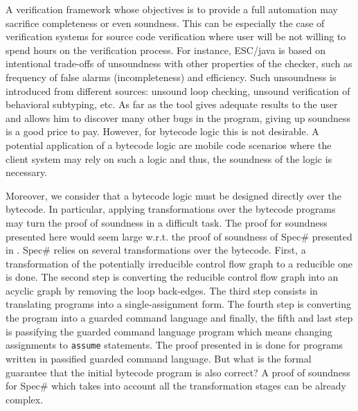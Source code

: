 A verification framework whose objectives is to provide a full automation may sacrifice completeness or even soundness.
This can be especially the case of verification systems for source code verification where user 
will be not willing to spend hours on the verification process. For instance, ESC/java
 \cite{escjava} is based on intentional trade-offs of unsoundness with other properties of the checker, 
such as frequency of false alarms (incompleteness) and efficiency. Such unsoundness is introduced from different sources: unsound loop checking, unsound
verification of behavioral subtyping, etc.  As far as the tool gives adequate results to the user and allows him 
to discover  many other bugs in the program, giving up soundness  is a good price to pay. 
However, for bytecode logic this is not desirable. A potential application of  a bytecode logic are mobile code scenarios
where the client system may rely on such a logic and thus, the soundness of the logic is necessary. 

Moreover, we consider that a bytecode logic must be designed directly over the  bytecode. 
In particular, applying transformations over the bytecode programs may turn 
the proof of soundness in a difficult task.  
 The proof for soundness presented here would seem large w.r.t. 
the proof of soundness of Spec\# presented in  \cite{leinoWPUP}. Spec\# relies on several transformations over the 
bytecode. First, a transformation of the potentially irreducible control flow graph to a reducible one is done.
The second step  is converting the reducible control flow graph into an acyclic graph by removing the loop back-edges.
 The third step consists in translating programs into a single-assignment form.
The fourth step is converting the program into a  guarded command language and finally, the fifth and last 
step is passifying the guarded command language program which means changing assignments
to \texttt{assume} statements. The proof presented in  
\cite{leinoWPUP} is done for  programs written in passified guarded command language.
But what is the formal guarantee that the initial  bytecode program is also correct? 
A proof of soundness for Spec\# which takes into account all the transformation stages can be 
already complex. 
